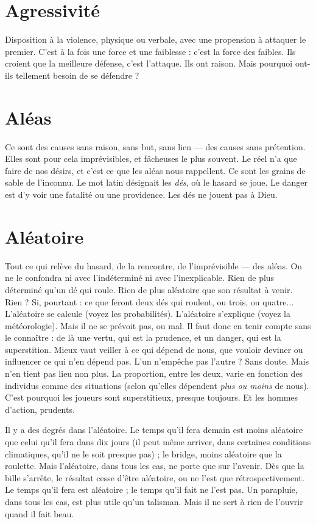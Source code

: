 \section{Agressivité}
Disposition à la violence, physique ou verbale, avec une propension
à attaquer le premier. C’est à la fois une force et une
faiblesse : c’est la force des faibles. Ils croient que la meilleure défense, c’est
l'attaque. Ils ont raison. Mais pourquoi ont-ils tellement besoin de se défendre ?

\section{Aléas}
Ce sont des causes sans raison, sans but, sans lien — des causes sans
prétention. Elles sont pour cela imprévisibles, et fâcheuses le plus
souvent. Le réel n’a que faire de nos désirs, et c’est ce que les aléas nous rappellent.
Ce sont les grains de sable de l'inconnu. Le mot latin désignait les {\it dés}, où
le hasard se joue. Le danger est d’y voir une fatalité ou une providence. Les dés
ne jouent pas à Dieu.

\section{Aléatoire}
Tout ce qui relève du hasard, de la rencontre, de l’imprévisible
— des aléas. On ne le confondra ni avec l’indéterminé ni avec
l’inexplicable. Rien de plus déterminé qu’un dé qui roule. Rien de plus aléatoire
que son résultat à venir. Rien ? Si, pourtant : ce que feront deux dés qui
roulent, ou trois, ou quatre... L’aléatoire se calcule (voyez les probabilités).
L’aléatoire s'explique (voyez la météorologie). Mais il ne se prévoit pas, ou mal.
Il faut donc en tenir compte sans le connaître : de là une vertu, qui est la prudence,
et un danger, qui est la superstition. Mieux vaut veiller à ce qui dépend
de nous, que vouloir deviner ou influencer ce qui n’en dépend pas. L’un
n'empêche pas l’autre ? Sans doute. Mais n’en tient pas lieu non plus. La proportion,
entre les deux, varie en fonction des individus comme des situations
(selon qu’elles dépendent {\it plus ou moins} de nous). C’est pourquoi les joueurs
sont superstitieux, presque toujours. Et les hommes d’action, prudents.

Il y a des degrés dans l’aléatoire. Le temps qu’il fera demain est moins aléatoire
que celui qu’il fera dans dix jours (il peut même arriver, dans certaines
conditions climatiques, qu’il ne le soit presque pas) ; le bridge, moins aléatoire
que la roulette. Mais l’aléatoire, dans tous les cas, ne porte que sur l’avenir. Dès
que la bille s'arrête, le résultat cesse d’être aléatoire, ou ne l’est que rétrospectivement.
Le temps qu’il fera est aléatoire ; le temps qu’il fait ne l’est pas. Un
parapluie, dans tous les cas, est plus utile qu’un talisman. Mais il ne sert à rien
de l’ouvrir quand il fait beau.

